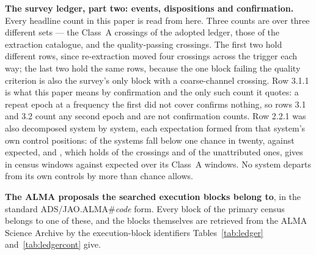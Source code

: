 \begin{table}
\centering
\scriptsize
\caption{\textbf{The survey ledger, part two: events, dispositions and
confirmation.} Every headline count in this paper is read from here. Three
counts are \MtCrossA{} over three different sets --- the Class~A crossings of
the adopted ledger, those of the extraction catalogue, and the
quality-passing crossings. The first two hold different rows, since re-extraction moved four
crossings across the trigger each way; the last two hold the same rows,
because the one block failing the quality criterion is also the survey's only
block with a coarse-channel crossing. Row 3.1.1 is what this
paper means by confirmation and the only such count it quotes: a repeat epoch
at a frequency the first did not cover confirms nothing, so rows 3.1 and 3.2
count any second epoch and are not confirmation counts. Row 2.2.1 was also
decomposed system by system, each expectation formed from that system's own
control positions: \MtNSysLowP{} of the \MtNSysChance{} systems fall below
one chance in twenty, against \MtNSysLowPExp{} expected, and \MtTopStar,
which holds \MtTopStarNCross{} of the \EvNCrossRaw{} crossings and
\MtTopStarNUnattr{} of the unattributed ones, gives \MtTopSysObs{} in census
windows against \MtTopSysExp{} expected over its \MtTopSysNWin{} Class~A
windows. No system
departs from its own controls by more than chance allows.}
\label{tab:counts}

\end{table}


\begin{table}
\centering
\scriptsize
\caption{\textbf{The \NProjCodes{} ALMA proposals the searched execution
blocks belong to}, in the standard
\mbox{ADS/JAO.ALMA\#\textit{code}} form. Every block of the primary census
belongs to one of these, and the blocks themselves are retrieved from the
ALMA Science Archive by the execution-block identifiers
Tables~\ref{tab:ledger} and~\ref{tab:ledgercont}
give.\ProjCodeUnresClause}
\label{tab:projcodes}

\end{table}
